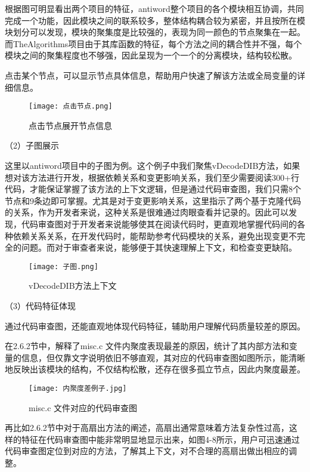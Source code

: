 根据图可明显看出两个项目的特征，antiword整个项目的各个模块相互协调，共同完成一个功能，因此模块之间的联系较多，整体结构耦合较为紧密，并且按所在模块划分可以发现，模块的聚集度是比较强的，表现为同一颜色的节点聚集在一起。而TheAlgorithms项目由于其库函数的特征，每个方法之间的耦合性并不强，每个模块之间的聚集程度也不够强，因此呈现为一个一个的分离模块，结构较松散。

点击某个节点，可以显示节点具体信息，帮助用户快速了解该方法或全局变量的详细信息。

\begin{figure}[h]
    \centering
    \texttt{[image: 点击节点.png]}
    \caption{点击节点展开节点信息}
    \end{figure}

（2）子图展示

这里以antiword项目中的子图为例。这个例子中我们聚焦vDecodeDIB方法，如果想对该方法进行开发，根据依赖关系和变更影响关系，我们至少需要阅读300+行代码，才能保证掌握了该方法的上下文逻辑，但是通过代码审查图，我们只需8个节点和9条边即可掌握。尤其是对于变更影响关系，这里指示了两个基于克隆代码的关系，作为开发者来说，这种关系是很难通过肉眼查看并记录的。因此可以发现，代码审查图对于开发者来说能够使其在阅读代码时，更直观地掌握代码间的各种依赖关系关系，在开发代码时，能帮助参考代码模块的关系，避免出现变更不完全的问题。而对于审查者来说，能够便于其快速理解上下文，和检查变更缺陷。
\clearpage

\begin{figure}[h]
    \centering
    \texttt{[image: 子图.png]}
    \caption{vDecodeDIB方法上下文}
    \end{figure}

（3）代码特征体现

通过代码审查图，还能直观地体现代码特征，辅助用户理解代码质量较差的原因。

在2.6.2节中，解释了misc.c 文件内聚度表现最差的原因，统计了其内部方法和变量的信息，但仅靠文字说明依旧不够直观，其对应的代码审查图如图所示，能清晰地反映出该模块的结构，不仅结构松散，还存在很多孤立节点，因此内聚度最差。

\begin{figure}[h]
\centering
\texttt{[image: 内聚度差例子.jpg]}
\caption{misc.c 文件对应的代码审查图}
\end{figure}

再比如2.6.2节中对于高扇出方法的阐述，高扇出通常意味着方法复杂性过高，这样的特征在代码审查图中能非常明显地显示出来，如图4-8所示，用户可迅速通过代码审查图定位到对应的方法，了解其上下文，对不合理的高扇出做出相应的调整。

